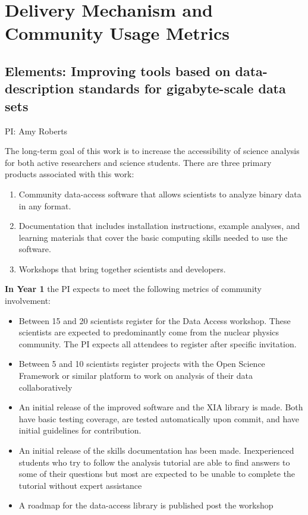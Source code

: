\documentclass[11pt,oneside]{memoir}
\begin{document}
\mainmatter
\pagestyle{bodystyle}

\section*{Delivery Mechanism and Community Usage Metrics}
\subsection*{Elements: Improving tools based on data-description standards for gigabyte-scale data sets}
PI: Amy Roberts

The long-term goal of this work is to increase the accessibility of science analysis for both active researchers and science students.  There are three primary products associated with this work:
\vspace{-1mm}
\begin{enumerate}
  \item Community data-access software that allows scientists to analyze binary data in any format. 
  \item Documentation that includes installation instructions, example analyses, and learning materials that cover the basic computing skills needed to use the software.
  \item Workshops that bring together scientists and developers.
\end{enumerate}

\textbf{In Year 1}  the PI expects to meet the following metrics of community involvement:
\begin{itemize}
  \item Between 15 and 20 scientists register for the Data Access workshop.  These scientists are expected to predominantly come from the nuclear physics community.  The PI expects all attendees to register after specific invitation.
  \item Between 5 and 10 scientists register projects with the Open Science Framework or similar platform to work on analysis of their data collaboratively
  \item An initial release of the improved software and the XIA library is made.  Both have basic testing coverage, are tested automatically upon commit, and have initial guidelines for contribution.
  \item An initial release of the skills documentation has been made.  Inexperienced students who try to follow the analysis tutorial are able to find answers to some of their questions but most are expected to be unable to complete the tutorial without expert assistance
  \item A roadmap for the data-access  library is published post the workshop
\end{itemize}
\end{document}
